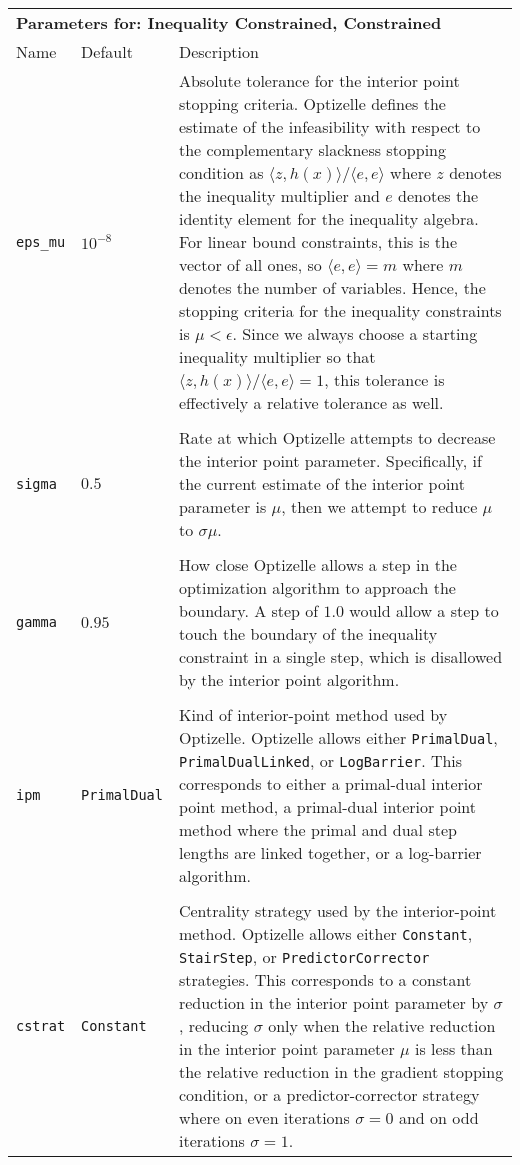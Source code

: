 \documentclass{report}
\begin{document}
\begin{longtable}{llp{}}
\\
\multicolumn{3}{p{\textwidth}}{\bf Parameters for: Inequality Constrained, Constrained}\\
Name & Default & Description\\
\texttt{eps\_mu} & $10^{-8}$
    & Absolute tolerance for the interior point stopping criteria.  Optizelle defines the estimate of the infeasibility with respect to the complementary slackness stopping condition as $\langle z,h(x) \rangle/\langle e,e\rangle$ where $z$ denotes the inequality multiplier and $e$ denotes the identity element for the inequality algebra.  For linear bound constraints, this is the vector of all ones, so $\langle e,e\rangle=m$ where $m$ denotes the number of variables.  Hence, the stopping criteria for the inequality constraints is $\mu < \epsilon$.  Since we always choose a starting inequality multiplier so that $\langle z,h(x) \rangle/\langle e,e\rangle=1$, this tolerance is effectively a relative tolerance as well.\\
\\
\texttt{sigma} & $0.5$
    & Rate at which Optizelle attempts to decrease the interior point parameter.  Specifically, if the current estimate of the interior point parameter is $\mu$, then we attempt to reduce $\mu$ to $\sigma \mu$.\\
\\
\texttt{gamma} & $0.95$
    & How close Optizelle allows a step in the optimization algorithm to approach the boundary.  A step of $1.0$ would allow a step to touch the boundary of the inequality constraint in a single step, which is disallowed by the interior point algorithm.\\
\\
\texttt{ipm} & \texttt{PrimalDual}
    & Kind of interior-point method used by Optizelle.  Optizelle allows either \texttt{PrimalDual}, \texttt{PrimalDualLinked}, or \texttt{LogBarrier}.  This corresponds to either a primal-dual interior point method, a primal-dual interior point method where the primal and dual step lengths are linked together, or a log-barrier algorithm.\\
\\
\texttt{cstrat} & \texttt{Constant}
    & Centrality strategy used by the interior-point method.  Optizelle allows either \texttt{Constant}, \texttt{StairStep}, or \texttt{PredictorCorrector} strategies.  This corresponds to a constant reduction in the interior point parameter by $\sigma$, reducing $\sigma$ only when the relative reduction in the interior point parameter $\mu$ is less than the relative reduction in the gradient stopping condition, or a predictor-corrector strategy where on even iterations $\sigma=0$ and on odd iterations $\sigma=1$.\\

\end{longtable}
\end{document}
